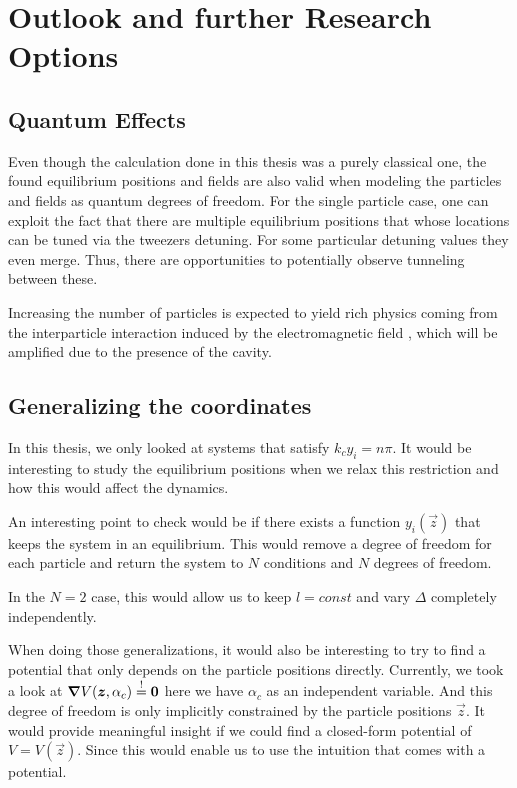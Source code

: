\chapter{Outlook and further Research Options}
\label{ch:otl}

\section{Quantum Effects}

Even though the calculation done in this thesis was a purely classical one,
    the found equilibrium positions and fields are also valid when modeling the particles 
    and fields as quantum degrees of freedom.
For the single particle case, one can exploit the fact that there are multiple equilibrium positions that whose locations can be tuned via the tweezers detuning. 
For some particular detuning values they even merge. Thus, there are opportunities to potentially observe tunneling between these.

Increasing the number of particles is expected to yield rich physics coming from the interparticle interaction induced by the electromagnetic field \cite{doi:10.1126/science.abp9941},
    which will be amplified due to the presence of the cavity.

\section{Generalizing the coordinates}
In this thesis, we only looked at systems that satisfy $k_c y_i = n\pi$.
It would be interesting to study the equilibrium positions when we relax this restriction
    and how this would affect the dynamics.

An interesting point to check would be if there exists a function $y_i(\vec z)$ that keeps the system in an equilibrium. 
This would remove a degree of freedom for each particle
    and return the system to $N$ conditions and $N$ degrees of freedom.
    
In the $N=2$ case, this would allow us to keep $l = const$ and vary $\Delta$ completely independently.

When doing those generalizations, 
    it would also be interesting to try to find a potential that only depends on the particle positions directly.
Currently,
    we took a look at $\bm{\nabla} V(\bm{z}, \alpha_c) \overset{!}{=} \bm{0}$
    here we have $\alpha_c$ as an independent variable.
And this degree of freedom is only implicitly constrained by the particle positions $\vec z$.
It would provide meaningful insight if we could find a closed-form potential of $V = V(\vec z)$.
Since this would enable us to use the intuition that comes with a potential.


